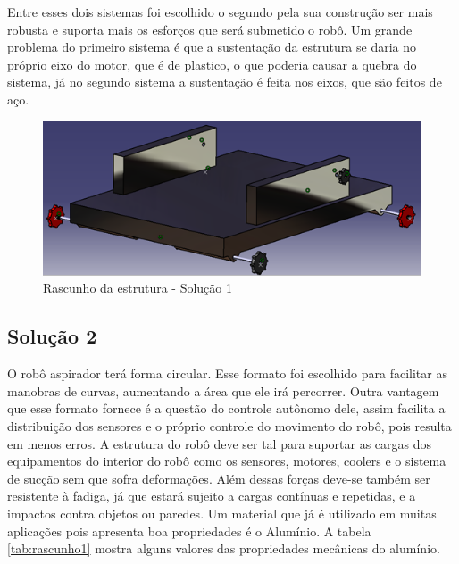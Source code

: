 		Entre esses dois sistemas foi escolhido o segundo pela sua construção ser mais robusta e suporta mais os esforços que será submetido o robô. Um grande problema do primeiro sistema é que a sustentação da estrutura se daria no próprio eixo do motor, que é de plastico, o que poderia causar a quebra do sistema, já no segundo sistema a sustentação é feita nos eixos, que são feitos de aço.
		
		\begin{figure}[H]
			\centering
			\includegraphics[scale=0.8]{figuras/rascunho_estrutura.png}
			\caption{Rascunho da estrutura - Solução 1}
			\label{img:rascunho1}
		\end{figure}


		\subsection{Solução 2} %
		\label{sub:solução_2}
			
			O robô aspirador terá forma circular. Esse formato foi escolhido para facilitar as manobras de curvas, aumentando a área que ele irá percorrer. Outra vantagem que esse formato fornece é a questão do controle autônomo dele, assim facilita a distribuição dos sensores e o próprio controle do movimento do robô, pois resulta em menos erros. A estrutura do robô deve ser tal para suportar as cargas dos equipamentos do interior do robô como os sensores, motores, coolers e o sistema de sucção sem que sofra deformações. Além dessas forças deve-se também ser resistente à fadiga, já que estará sujeito a cargas contínuas e repetidas, e a impactos contra objetos ou paredes. Um material que já é utilizado em muitas aplicações pois apresenta boa propriedades é o Alumínio. A tabela \ref{tab:rascunho1} mostra alguns valores das propriedades mecânicas do alumínio.


